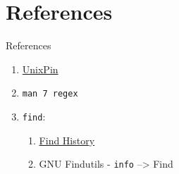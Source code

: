 \documentclass[11pt]{beamer}
\begin{document}

	\section{References}
		\begin{frame}{References}
			\begin{enumerate}
				\item \href{http://find.unixpin.com/}{UnixPin}
				\item \texttt{man 7 regex}
				\item {
						\texttt{find}:
						\begin{enumerate}
							\item \href{http://doc.cat-v.org/unix/find-history}{Find History}
							\item GNU Findutils - \texttt{info} --> Find
						\end{enumerate}
					}
			\end{enumerate}
		\end{frame}
\end{document}
